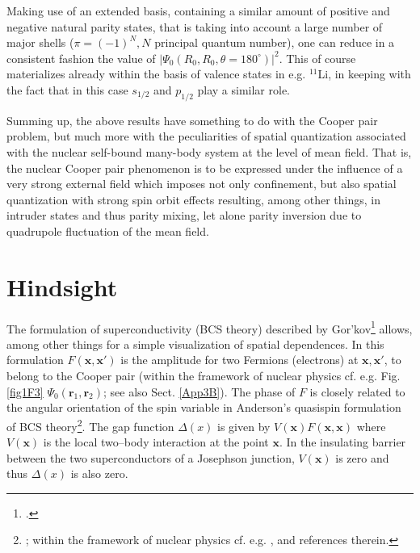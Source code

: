 Making use of an extended basis, containing a similar amount of positive and negative natural parity states, that is taking into account a large number of major shells ($\pi=(-1)^N, N$ principal quantum number), one can reduce in a consistent fashion the value of $|\Psi_0(R_0,R_0,\theta=180^\circ)|^2$.
This of course materializes already within the basis of valence states in e.g. $^{11}$Li, in keeping with the fact that in this case $s_{1/2}$ and $p_{1/2}$ play a similar role. 


Summing up, the above results have something to do with the Cooper pair problem, but much more with the peculiarities of spatial quantization associated with the nuclear self-bound many-body system at the level of mean field. That is, the nuclear Cooper pair phenomenon  is to be expressed under the influence of a very strong external field which imposes not only confinement, but also spatial quantization with strong spin orbit effects resulting, among other things, in intruder states and thus parity mixing, let alone parity inversion due to quadrupole fluctuation of the mean field.   

\section{Hindsight}\label{C3AppE}
The formulation of superconductivity (BCS theory) described by  Gor'kov\footnote{\cite{Gorkov:58,Gorkov:59}.} allows, among other things for a simple visualization of spatial dependences. In this formulation $F(\mathbf{x},\mathbf{x}')$ is the amplitude for two Fermions (electrons) at $\mathbf{x},\mathbf{x}'$, to belong to the Cooper pair (within the framework of nuclear physics cf. e.g. Fig. \ref{fig1F3} $\Psi_0(\mathbf{r}_1,\mathbf{r}_2)$; see also Sect. \ref{App3B}). The phase of $F$ is closely  related to the angular orientation of the spin variable  in Anderson's quasispin formulation of BCS theory\footnote{\cite{Anderson:58b}; within the framework of nuclear physics cf. e.g. \cite{Bohr:88}, \cite{Potel:13b} and references therein.}. The gap function $\Delta(x)$ is given by $V(\mathbf{x})F(\mathbf{x},\mathbf{x})$ where $V(\mathbf{x})$ is the local two--body interaction at the point $\mathbf x$. In the insulating barrier between the two superconductors of a Josephson junction, $V(\mathbf{x})$ is zero and thus $\Delta(x)$ is also zero. 



